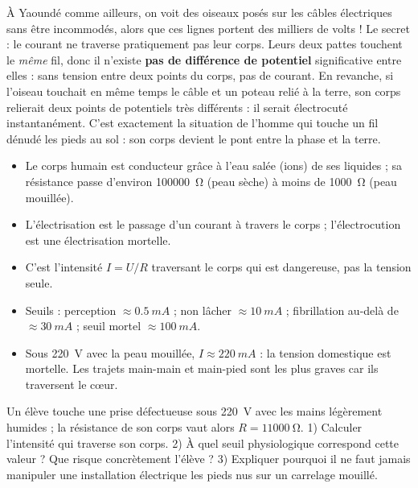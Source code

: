 \documentclass[11pt]{article}
\newcommand{\cle}[1]{{\popxbold\color{popdark}#1}}
\begin{document}
\begin{savaistu}
À Yaoundé comme ailleurs, on voit des oiseaux posés sur les câbles électriques sans être incommodés, alors que ces lignes portent des milliers de volts ! Le secret : le courant ne traverse pratiquement pas leur corps. Leurs deux pattes touchent le \emph{même} fil, donc il n'existe \textbf{pas de différence de potentiel} significative entre elles : sans tension entre deux points du corps, pas de courant. En revanche, si l'oiseau touchait en même temps le câble et un poteau relié à la terre, son corps relierait deux points de potentiels très différents : il serait électrocuté instantanément. C'est exactement la situation de l'homme qui touche un fil dénudé les pieds au sol : son corps devient le pont entre la phase et la terre.
\end{savaistu}

\begin{aretenir}
\begin{itemize}
\item Le corps humain est \cle{conducteur} grâce à l'eau salée (ions) de ses liquides ; sa résistance passe d'environ \SI{100000}{\ohm} (peau sèche) à moins de \SI{1000}{\ohm} (peau mouillée).
\item L'\cle{électrisation} est le passage d'un courant à travers le corps ; l'\cle{électrocution} est une électrisation mortelle.
\item C'est l'\cle{intensité} $I = U/R$ traversant le corps qui est dangereuse, pas la tension seule.
\item Seuils : perception $\approx \SI{0,5}{mA}$ ; non lâcher $\approx \SI{10}{mA}$ ; fibrillation au-delà de $\approx \SI{30}{mA}$ ; seuil mortel $\approx \SI{100}{mA}$.
\item Sous \SI{220}{V} avec la peau mouillée, $I \approx \SI{220}{mA}$ : la tension domestique est mortelle. Les trajets main-main et main-pied sont les plus graves car ils traversent le cœur.
\end{itemize}
\end{aretenir}

\begin{exercice}
Un élève touche une prise défectueuse sous \SI{220}{V} avec les mains légèrement humides ; la résistance de son corps vaut alors $R = \SI{11000}{\ohm}$. 1) Calculer l'intensité qui traverse son corps. 2) À quel seuil physiologique correspond cette valeur ? Que risque concrètement l'élève ? 3) Expliquer pourquoi il ne faut jamais manipuler une installation électrique les pieds nus sur un carrelage mouillé.
\end{exercice}
\end{document}
